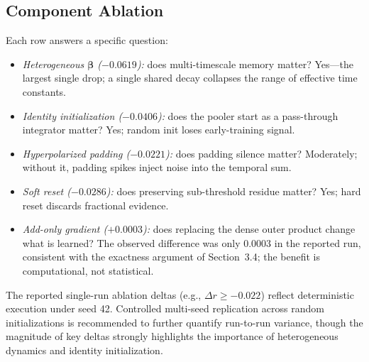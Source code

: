 \documentclass[10pt,journal,compsoc]{IEEEtran}
\begin{document}
\subsection{Component Ablation}
\begin{table}[t!]
\caption{Component ablation ($D_{model}=256$). $\Delta r$ is relative to the full model on ALL-STS.}
\label{tab:component_ablation}
\begin{center}
\end{center}
\end{table}

Each row answers a specific question:
\begin{itemize}
    \item \emph{Heterogeneous $\bm{\beta}$ ($-0.0619$):} does multi-timescale memory matter? Yes---the largest single drop; a single shared decay collapses the range of effective time constants.
    \item \emph{Identity initialization ($-0.0406$):} does the pooler start as a pass-through integrator matter? Yes; random init loses early-training signal.
    \item \emph{Hyperpolarized padding ($-0.0221$):} does padding silence matter? Moderately; without it, padding spikes inject noise into the temporal sum.
    \item \emph{Soft reset ($-0.0286$):} does preserving sub-threshold residue matter? Yes; hard reset discards fractional evidence.
    \item \emph{Add-only gradient ($+0.0003$):} does replacing the dense outer product change what is learned? The observed difference was only $0.0003$ in the reported run, consistent with the exactness argument of Section~3.4; the benefit is computational, not statistical.
\end{itemize}
The reported single-run ablation deltas (e.g., $\Delta r \ge -0.022$) reflect deterministic execution under seed 42. Controlled multi-seed replication across random initializations is recommended to further quantify run-to-run variance, though the magnitude of key deltas strongly highlights the importance of heterogeneous dynamics and identity initialization.
\end{document}
